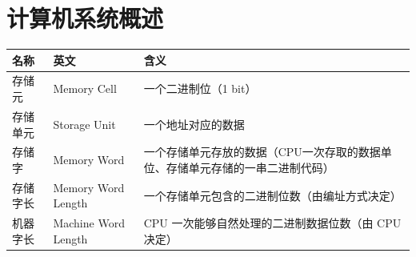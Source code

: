 \documentclass[./computer-organization-and-architecture.tex]{subfiles}
\begin{document}
    \section{计算机系统概述}

    \begin{table}[htbp]
        \centering
        \renewcommand{\arraystretch}{1.5}   %
        \setlength{\tabcolsep}{6pt}         %
        \small
        \begin{tabular}{|
                >{\centering\arraybackslash}m{1.8cm}|
                >{\centering\arraybackslash}m{3.5cm}|
                >{\centering\arraybackslash}m{10cm}|}
            \hline
            \textbf{名称} & \textbf{英文}         & \textbf{含义}                              \\
            \hline
            存储元         & Memory Cell         & 一个二进制位（1 bit）                            \\
            \hline
            存储单元        & Storage Unit        & 一个地址对应的数据                                \\
            \hline
            存储字         & Memory Word         & 一个存储单元存放的数据（CPU一次存取的数据单位、存储单元存储的一串二进制代码） \\
            \hline
            存储字长        & Memory Word Length  & 一个存储单元包含的二进制位数（由编址方式决定）                  \\
            \hline
            机器字长        & Machine Word Length & CPU 一次能够自然处理的二进制数据位数（由 CPU 决定）           \\
            \hline
        \end{tabular}
    \end{table}
\end{document}
